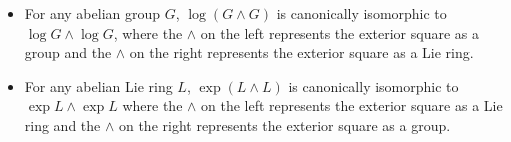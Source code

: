 \documentclass{ucetd}
\begin{document}
\begin{itemize}
\item For any abelian group $G$, $\log(G \wedge G)$ is canonically
  isomorphic to $\log G \wedge \log G$, where the $\wedge$ on the left
  represents the exterior square as a group and the $\wedge$ on the
  right represents the exterior square as a Lie ring.
\item For any abelian Lie ring $L$, $\exp(L \wedge L)$ is canonically
  isomorphic to $\exp L \wedge \exp L$ where the $\wedge$ on the left
  represents the exterior square as a Lie ring and the $\wedge$ on the
  right represents the exterior square as a group.
\end{itemize}



\end{document}
